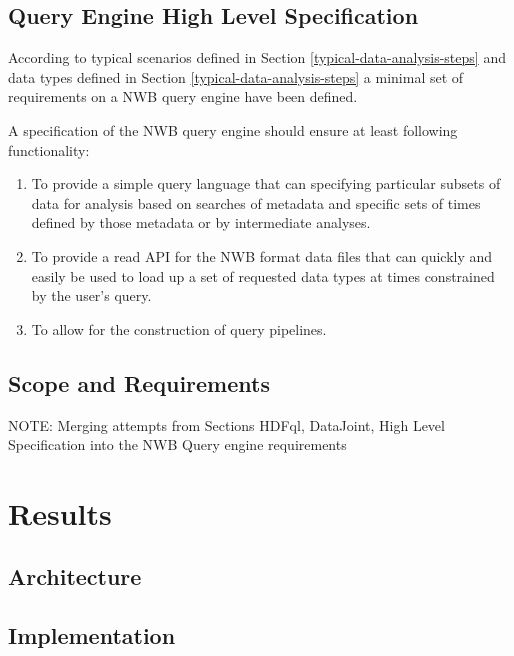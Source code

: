 \documentclass[utf8]{frontiersSCNS} %
\begin{document}
\subsection{Query Engine High Level Specification}
\label{Query_engine_specification}

According to typical scenarios defined in Section \ref{typical-data-analysis-steps} and data types defined in Section \ref{typical-data-analysis-steps} a minimal set of requirements on a NWB query engine have been defined.

A specification of the NWB query engine should ensure at least following functionality:
\begin{enumerate}
 \item To provide a simple query language that can specifying particular subsets of data for analysis based on searches of metadata and specific sets of times defined by those metadata or by intermediate analyses.
 \item To provide a read API for the NWB format data files that can quickly and easily be used to load up a set of requested data types at times constrained by the user’s query.
 \item To allow for the construction of query pipelines.
\end{enumerate}


\subsection{Scope and Requirements}
\label{Scope_and_requirements}

NOTE: Merging attempts from Sections HDFql, DataJoint, High Level Specification into the NWB Query engine requirements

\section{Results}
\label{results}

\subsection{Architecture}
\label{Architecture}

\subsection{Implementation}
\label{Implementation}
\end{document}
